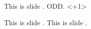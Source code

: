 \documentclass{beamer}
\newcommand{\insertonodd}{%
    \ifodd\insertoverlaynumber
        This is slide \insertoverlaynumber. ODD.
    \else
        \only<\numexpr\insertoverlaynumber+1\relax>{}
    \fi
}
\begin{document}
\begin{frame}

\insertonodd

  {This is slide \insertoverlaynumber.}
  {This is slide \insertoverlaynumber.}
\end{frame}
\end{document}
